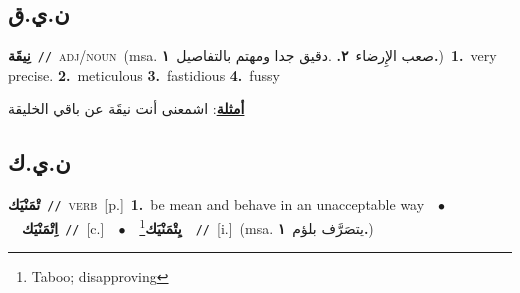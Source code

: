 \documentclass[10pt,a4paper,twoside]{article} %
\begin{document}
\begin{multicols}{2}
\vspace{-3mm}
\subsection*{\color{blue}\foreignlanguage{arabic}{ن.ي.ق}\color{blue}{}} 

{\setlength\topsep{0pt}\textbf{\foreignlanguage{arabic}{نِيقَة}}\ {\color{gray}\texttt{//}\color{black}}\ \textsc{adj/noun}\ \color{gray}(msa. \foreignlanguage{arabic}{صعب الإِرضاء}~\foreignlanguage{arabic}{\textbf{٢.}}  .\foreignlanguage{arabic}{دقيق جدا ومهتم بالتفاصيل}~\foreignlanguage{arabic}{\textbf{١.}})\color{black}\ \textbf{1.}~very precise.  \textbf{2.}~meticulous  \textbf{3.}~fastidious  \textbf{4.}~fussy\  \begin{flushright}\color{gray}\foreignlanguage{arabic}{\textbf{\underline{\foreignlanguage{arabic}{أمثلة}}}: اشمعنى أنت نيقَة عن باقي الخليقة}\end{flushright}\color{black}} \vspace{2mm}

\vspace{-3mm}
\subsection*{\color{blue}\foreignlanguage{arabic}{ن.ي.ك}\color{blue}{}} 

{\setlength\topsep{0pt}\textbf{\foreignlanguage{arabic}{تْمَنْيَك}}\ {\color{gray}\texttt{//}\color{black}}\ \textsc{verb}\ [p.]\ \textbf{1.}~be mean and behave in an unacceptable way\ \ $\bullet$\ \ \setlength\topsep{0pt}\textbf{\foreignlanguage{arabic}{اِتْمَنْيَك}}\ {\color{gray}\texttt{//}\color{black}}\ [c.]\ \ $\bullet$\ \ \setlength\topsep{0pt}\textbf{\foreignlanguage{arabic}{يِتْمَنْيَك}}\footnote{Taboo; disapproving}\ \ {\color{gray}\texttt{//}\color{black}}\ [i.]\ \color{gray}(msa. \foreignlanguage{arabic}{يتصَرَّف بلؤم}~\foreignlanguage{arabic}{\textbf{١.}})\color{black}\ } \vspace{2mm}


\end{multicols}
\end{document}
